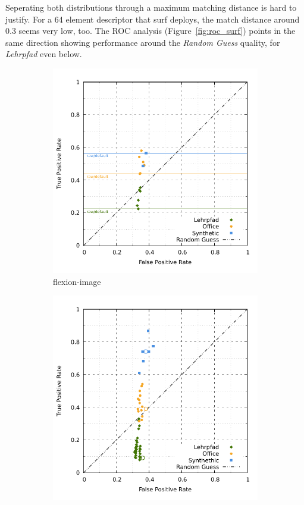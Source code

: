Seperating both distributions through a maximum matching distance is hard to justify.
For a 64 element descriptor that \acrshort{surf} deploys, the match distance around \num{0.3} seems very low, too.
The \acrshort{ROC} analysis (Figure~\ref{fig:roc_surf}) points in the same direction showing performance around the \emph{Random Guess} quality, for \emph{Lehrpfad} even below.
\begin{figure}[H]
\begin{subfigure}[t]{0.45\linewidth}
    \includegraphics[width=\linewidth]{chapter06/results/SURF/flexion/roc.pdf}%
    \caption{\gls{flexion-image}}
\end{subfigure}\quad
\begin{subfigure}[t]{0.45\linewidth}
    \includegraphics[width=\linewidth]{chapter06/results/SURF/bearing/roc.pdf}

\end{subfigure}
\end{figure}
